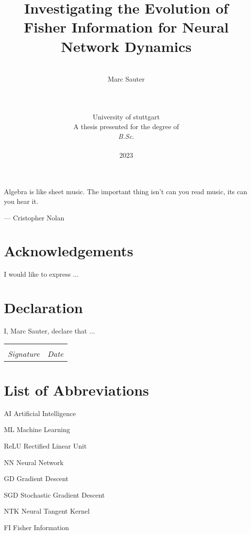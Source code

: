 \documentclass[12pt, twoside, a4paper]{report}
\date{}
\title{Investigating the Evolution of Fisher Information for Neural Network Dynamics}
\author{\\ \Large{Marc Sauter}
	\\
	\\
	\\
	\\ University of stuttgart
	\\
	A thesis presented for the degree of \\ \textit{B.Sc.}
	\\ \\
	2023
}
\begin{document}
	\thispagestyle{headings}
	\maketitle
	\FloatBarrier
	
	\newpage
	\thispagestyle{empty}
	\epigraph{Algebra is like sheet music. The important thing isn't can you read music, its can you hear it.}{--- \textup{Cristopher Nolan}}
	
	\thispagestyle{empty}
	\chapter*{Acknowledgements}
	I would like to express ...
	
	
	\thispagestyle{empty}
	\chapter*{Declaration}
	I, Marc Sauter, declare that ...
	
	\vspace{3cm}
	\noindent\begin{tabular}{ll}
		\makebox[2.5in]{\hrulefill} & \makebox[2.5in]{\hrulefill}\\
		\textit{Signature} & \textit{Date}\\
	\end{tabular}
	
	\thispagestyle{empty}
	\begin{abstract}
		\lipsum[1-2]
		
	\end{abstract}
	\tableofcontents
	\thispagestyle{plain}
	
	\chapter*{List of Abbreviations}
	\begin{abbreviations}
		\item[AI] Artificial Intelligence
		\item[ML] Machine Learning
		\item[ReLU] Rectified Linear Unit
		\item[NN] Neural Network
		\item[GD] Gradient Descent
		\item[SGD] Stochastic Gradient Descent
		\item[NTK] Neural Tangent Kernel
		\item[FI] Fisher Information
	\end{abbreviations}	
\end{document}
